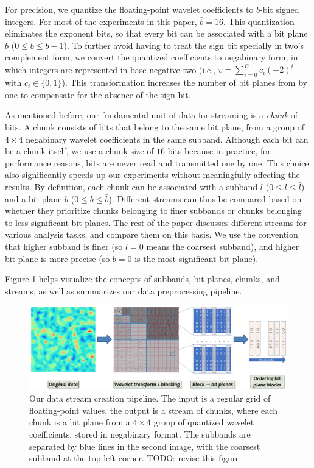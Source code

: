For precision, we quantize the floating-point wavelet coefficients to $\bar{b}$-bit signed integers.
For most of the experiments in this paper, $\bar{b}=16$. This quantization eliminates the exponent
bits, so that every bit can be associated with a bit plane $b$ ($0\leq b\leq \bar{b}-1$). To further
avoid having to treat the sign bit specially in two's complement form, we convert the quantized
coefficients to negabinary form, in which integers are represented in base negative two (i.e.,
$v=\sum_{i=0}^{B}{c_i(-2)^i}$ with $c_i\in \{0,1\}$). This transformation increases the number of
bit planes from by one to compensate for the absence of the sign bit.

As mentioned before, our fundamental unit of data for streaming is a \emph{chunk} of bits. A chunk
consists of bits that belong to the same bit plane, from a group of $4\times 4$ negabinary wavelet
coefficients in the same subband. Although each bit can be a chunk itself, we use a chunk size of
$16$ bits because in practice, for performance reasons, bits are never read and transmitted one by
one. This choice also significantly speeds up our experiments without meaningfully affecting the
results. By definition, each chunk can be associated with a subband $l$ ($0\leq l\leq \bar{l}$) and
a bit plane $b$ ($0\leq b\leq \bar{b}$). Different streams can thus be compared based on whether
they prioritize chunks belonging to finer subbands or chunks belonging to less significant bit
planes. The rest of the paper discusses different streams for various analysis tasks, and compare
them on this basis. We use the convention that higher subband is finer (so $l=0$ means the coarsest
subband), and higher bit plane is more precise (so $b=0$ is the most significant bit plane).

Figure \ref{fig:pipeline} helps visualize the concepts of subbands, bit planes, chunks, and streams,
as well as summarizes our data preprocessing pipeline.

\begin{figure}[h]
  \centering
  \includegraphics[width=\linewidth]{img/pipeline.png}
  \caption{Our data stream creation pipeline. The input is a regular grid of floating-point values,
  the output is a stream of chunks, where each chunk is a bit plane from a $4\times 4$ group of
  quantized wavelet coefficients, stored in negabinary format. The subbands are separated by blue
  lines in the second image, with the coarsest subband at the top left corner. TODO: revise this
  figure}
  \label{fig:pipeline}
\end{figure}

